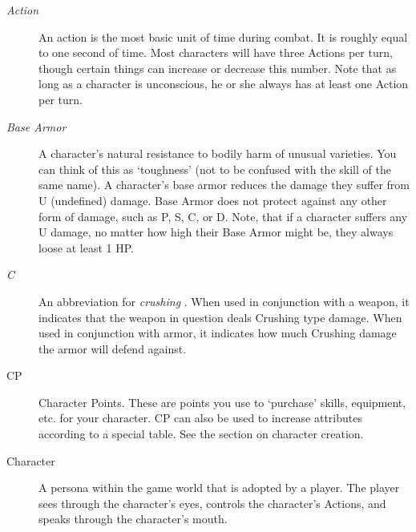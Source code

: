 \documentclass[twoside]{book}
\begin{document}
\begin{description}
    
  \item[
                \emph{ Action }
              ] 
    {  
    An action is the most basic unit of time during
                 combat. It is roughly equal to one second of time. Most
                 characters will have three Actions per turn, though
                 certain things can increase or decrease this number.
                 Note that as long as a character is unconscious, he or
                 she always has at least one Action per turn. 
    }
  
  \item[
                \emph{ Base Armor }
              ] 
    {  
     A character's natural resistance to bodily
                 harm of unusual varieties. You can think of this as
                 `toughness' (not to be confused with the
                 skill of the same name). A character's base armor
                 reduces the damage they suffer from U (undefined)
                 damage. Base Armor does not protect against any other
                 form of damage, such as P, S, C, or D. Note, that if a
                 character suffers any U damage, no matter how high their
                 Base Armor might be, they always loose at least 1 HP.
                 
    }
  
  \item[
                \emph{ C }
              ] 
    {  
     An abbreviation for 
                 \emph{ crushing } . When used in conjunction
                  with a weapon, it indicates that the weapon in question
                  deals Crushing type damage. When used in conjunction
                  with armor, it indicates how much Crushing damage the
                  armor will defend against.
              
    }
  
  \item[ CP ] 
    {  
     Character Points. These are points you use to
                 `purchase' skills, equipment, etc. for your
                 character. CP can also be used to increase attributes
                 according to a special table. See the section on
                 character creation. 
    }
  
  \item[ Character ] 
    {  
     A persona within the game world that is adopted
                 by a player. The player sees through the
                 character's eyes, controls the character's
                 Actions, and speaks through the character's mouth.
                 
}
\end{description}
\end{document}
